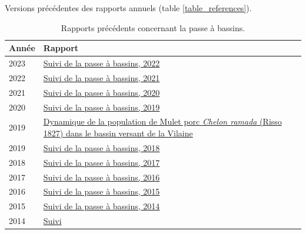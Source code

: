 \documentclass[11pt,twocolumn,titlepage,twoside]{article}\usepackage[]{graphicx}\usepackage[]{color}
\begin{document}
\clearpage
Versions précédentes des rapports annuels (table \ref{table_references}).


\begin{table}[htbp]
\centering
\caption{Rapports précédents concernant la passe à bassins.}
\begin{tabular}{lp{7cm}}
\toprule
Année & Rapport \\
\midrule
2023 &
\href{https://eptbvilaine56.sharepoint.com/:b:/g/extranet/EUqlfhsKgqpMkzWSuEo9uRABXEw73VtgoVhM8t-C6zGTiQ?e=MuQwCG}{Suivi
de la passe à bassins, 2022} \\
2022 &
\href{https://eptbvilaine56.sharepoint.com/:b:/g/extranet/EabAMF4YvrJJhxYU8-pm6JwBSLrjt05hvlhTO2kxb84Aag?e=yvfCUS}{Suivi
de la passe à bassins, 2021} \\
2021 &
\href{https://eptbvilaine56.sharepoint.com/:b:/g/extranet/EX0SnyoGmBlMsO-6-Il8wugBCHYxha3l2A-5tA9yTCqwbg?e=XukC2d}{Suivi
de la passe à bassins, 2020} \\
2020 &
\href{https://eptbvilaine56.sharepoint.com/:b:/g/extranet/EQl4smhm635FgMPzE9bFyxsB_9ZMmVLH34BJLfwieJKuUA?e=dtqKYE}{Suivi
de la passe à bassins, 2019} \\
2019 &
\href{https://eptbvilaine56.sharepoint.com/:b:/g/extranet/ESlFdwgrzNZPjHy2CamDrh4Bd-wJB1BhJ-Hf19RuTZlpgw?e=3pPkHa}{Dynamique de la population de Mulet porc \textit{Chelon ramada} (Risso 1827) dans le bassin versant de la Vilaine}\\
2019 & 
\href{https://eptbvilaine56.sharepoint.com/:b:/g/extranet/EfsNAFGO4sRAoEb-9-SEERoBJAxYBJVWvF-9OVVryuF8QA?e=G5x6Ij}{Suivi
de la passe à bassins, 2018}\\
2018 &
\href{https://eptbvilaine56.sharepoint.com/:b:/g/extranet/EddDt8hE-z5KvA3qWm8RiUYBiawsguFwtT101pmeEXjEiQ?e=TdLuRC}{Suivi
de la passe à bassins, 2017}\\
2017 &
\href{https://eptbvilaine56.sharepoint.com/:b:/g/extranet/EZovsRks3WFKsse_rsnnqh0BAcwjBH5ofFK1pjdwtAe6Dw?e=sRP0k9}{Suivi
de la passe à bassins, 2016}\\
2016 &
\href{https://eptbvilaine56.sharepoint.com/:b:/g/extranet/EUaIB9CdQItLkPTR0banFZYBv7DnfD7uNSezUSFVD9tfcw?e=ZAWC9t}{Suivi
de la passe à bassins, 2015}\\
2015 &
\href{https://eptbvilaine56.sharepoint.com/:b:/g/extranet/EQCdJUAzgLlJpqe-HgXcbn4BvTlV7Xool5zCmmV-fZaolg?e=dvEObL}{Suivi
de la passe à bassins, 2014}\\
2014 &
\href{https://eptbvilaine56.sharepoint.com/:b:/g/extranet/Effnw5jtEPFHmxCcqlWiTBsB0Cm29yADN5bSREbOi1yTzA?e=YS1Ref}{Suivi
}
\end{tabular}
\end{table}
\end{document}
